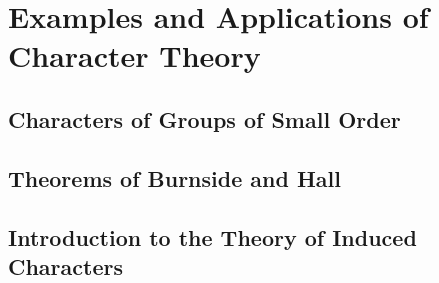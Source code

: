 \chapter{Examples and Applications of Character Theory}

\section{Characters of Groups of Small Order}

\section{Theorems of Burnside and Hall}

\section{Introduction to the Theory of Induced Characters}